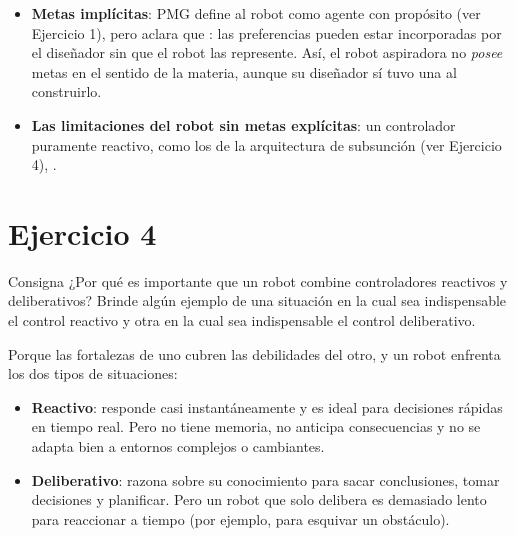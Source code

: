 \documentclass[11pt,a4paper]{article}
\begin{document}
\begin{extras}
\begin{itemize}
  \item \textbf{Metas implícitas}: PMG define al robot como agente con propósito (ver Ejercicio 1), pero aclara que : las preferencias pueden estar incorporadas por el diseñador sin que el robot las represente. Así, el robot aspiradora no \emph{posee} metas en el sentido de la materia, aunque su diseñador sí tuvo una al construirlo.
  \item \textbf{Las limitaciones del robot sin metas explícitas}: un controlador puramente reactivo, como los de la arquitectura de subsunción (ver Ejercicio 4), .
\end{itemize}
\end{extras}

\section{Ejercicio 4}

\begin{enunciado}{Consigna}
¿Por qué es importante que un robot combine controladores reactivos y deliberativos? Brinde algún ejemplo de una situación en la cual sea indispensable el control reactivo y otra en la cual sea indispensable el control deliberativo.
\end{enunciado}

Porque las fortalezas de uno cubren las debilidades del otro, y un robot enfrenta los dos tipos de situaciones:
\begin{itemize}
  \item \textbf{Reactivo}: responde casi instantáneamente y es ideal para decisiones rápidas en tiempo real. Pero no tiene memoria, no anticipa consecuencias y no se adapta bien a entornos complejos o cambiantes.
  \item \textbf{Deliberativo}: razona sobre su conocimiento para sacar conclusiones, tomar decisiones y planificar. Pero un robot que solo delibera es demasiado lento para reaccionar a tiempo (por ejemplo, para esquivar un obstáculo).
\end{itemize}
\end{document}
